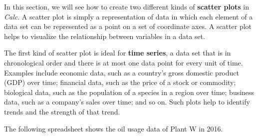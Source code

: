 In this section, we will see how to create two different kinds of {\bf scatter plots} in {\em Calc}. A scatter plot is simply a representation of data in which each element of a data set can be represented as a point on a set of coordinate axes. A scatter plot helps to visualize the relationship between variables in a data set.

The first kind of scatter plot is ideal for {\bf time series}, a data set that is in chronological order and there is at most one data point for every unit of time. Examples include economic data, such as a country's gross domestic product (GDP) over time; financial data, such as the price of a stock or commodity; biological data, such as the population of a species in a region over time; business data, such as a company's sales over time; and so on. Such plots help to identify trends and the strength of that trend.

The following spreadsheet shows the oil usage data of Plant W in 2016.

\begin{table}[ht!]
  \centering
  \label{sh:1-3-oil}
\end{table}

